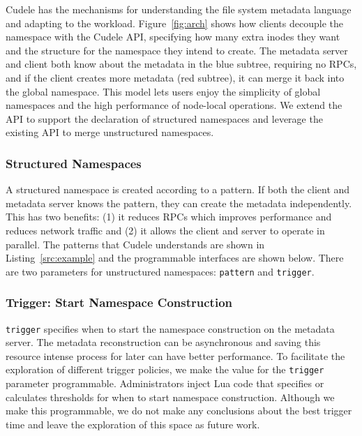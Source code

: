 Cudele has the mechanisms for understanding the file system metadata language
and adapting to the workload.  Figure~\ref{fig:arch} shows how clients decouple
the namespace with the Cudele API, specifying how many extra inodes they want
and the structure for the namespace they intend to create. The metadata server
and client both know about the metadata in the blue subtree, requiring no RPCs,
and if the client creates more metadata (red subtree), it can merge it back
into the global namespace.  This model lets users enjoy the simplicity of
global namespaces and the high performance of node-local operations.  We extend
the API to support the declaration of structured namespaces and leverage the
existing API to merge unstructured namespaces. 

\subsubsection{Structured Namespaces}
\label{sec:structured-namespaces}

A structured namespace is created according to a pattern. If both the client
and metadata server knows the pattern, they can create the metadata
independently. This has two benefits: (1) it reduces RPCs which improves
performance and reduces network traffic and (2) it allows the client and server
to operate in parallel.  The patterns that Cudele understands are shown in
Listing~\ref{src:example} and the programmable interfaces are shown below.
There are two parameters for unstructured namespaces: \texttt{pattern} and
\texttt{trigger}. 

\subsubsection{Trigger: Start Namespace Construction}

\texttt{trigger} specifies when to start the namespace construction on the
metadata server.  The metadata reconstruction can be asynchronous and saving
this resource intense process for later can have better performance. To
facilitate the exploration of different trigger policies, we make the value for
the \texttt{trigger} parameter programmable.  Administrators inject Lua code
that specifies or calculates thresholds for when to start namespace
construction. Although we make this programmable, we do not make any
conclusions about the best trigger time and leave the exploration of this space
as future work.

